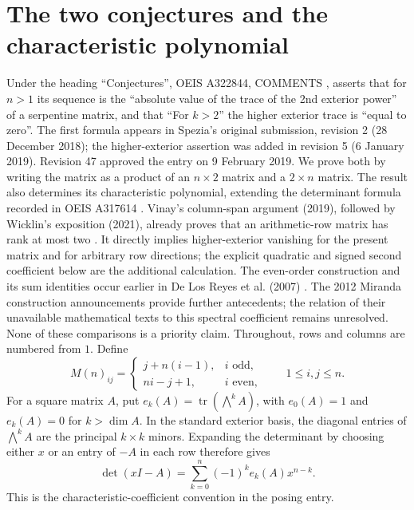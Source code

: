 \documentclass[11pt]{article}
\newcommand{\tr}{\operatorname{tr}}
\begin{document}
\section{The two conjectures and the characteristic polynomial}
Under the heading ``Conjectures'', OEIS A322844, COMMENTS \cite{posing},
asserts that for $n>1$ its sequence is the ``absolute value of the trace of
the 2nd exterior power'' of a serpentine matrix, and that ``For $k>2$''
the higher exterior trace is ``equal to zero''.
The first formula appears in Spezia's original submission, revision 2
(28 December 2018); the higher-exterior assertion was added in revision 5
(6 January 2019). Revision 47 approved the entry on 9 February 2019.
We prove both by writing the matrix as a product of an
$n\times2$ matrix and a $2\times n$ matrix. The result also determines its
characteristic polynomial, extending the determinant formula recorded in
OEIS A317614 \cite{matrix}. Vinay's column-span argument (2019), followed
by Wicklin's exposition (2021), already proves that an arithmetic-row
matrix has rank at most two \cite{vinay,wicklin}. It directly implies
higher-exterior vanishing for the present matrix and for arbitrary row
directions; the explicit quadratic and signed second coefficient below
are the additional calculation. The even-order construction and its sum
identities occur earlier in De Los Reyes et al. (2007) \cite{rectangles}.
The 2012 Miranda construction announcements \cite{miranda2012} provide
further antecedents; the relation of their unavailable mathematical texts
to this spectral coefficient remains unresolved. None of these comparisons
is a priority claim. Throughout, rows and columns are numbered from $1$.
Define
\begin{equation}\label{matrix}
 M(n)_{ij}=\begin{cases}
 j+n(i-1),&i\text{ odd},\\
 ni-j+1,&i\text{ even},
 \end{cases}\qquad 1\leq i,j\leq n.
\end{equation}
For a square matrix $A$, put $e_k(A)=\tr(\bigwedge^k A)$, with
$e_0(A)=1$ and $e_k(A)=0$ for $k>\dim A$. In the standard exterior basis,
the diagonal entries of $\bigwedge^k A$ are the principal $k\times k$
minors. Expanding the determinant by choosing either $x$ or an entry of
$-A$ in each row therefore gives
\begin{equation}\label{exterior}
 \det(xI-A)=\sum_{k=0}^{n}(-1)^k e_k(A)x^{n-k}.
\end{equation}
This is the characteristic-coefficient convention in the posing entry.
\end{document}
